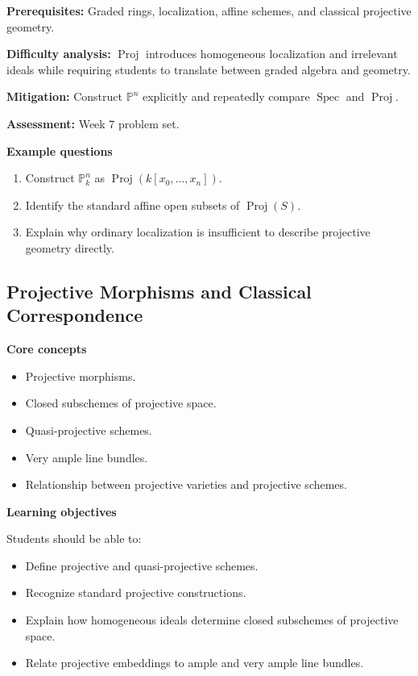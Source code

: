 \documentclass[11pt]{article}
\begin{document}
\textbf{Prerequisites:} Graded rings, localization, affine schemes, and classical projective geometry.

\textbf{Difficulty analysis:} $\operatorname{Proj}$ introduces homogeneous localization and irrelevant ideals while requiring students to translate between graded algebra and geometry.

\textbf{Mitigation:} Construct $\mathbb{P}^n$ explicitly and repeatedly compare $\operatorname{Spec}$ and $\operatorname{Proj}$.

\textbf{Assessment:} Week 7 problem set.

\textbf{Example questions}
\begin{enumerate}
    \item Construct $\mathbb{P}^n_k$ as $\operatorname{Proj}(k[x_0,\ldots,x_n])$.
    \item Identify the standard affine open subsets of $\operatorname{Proj}(S)$.
    \item Explain why ordinary localization is insufficient to describe projective geometry directly.
\end{enumerate}

\subsection{Projective Morphisms and Classical Correspondence}

\textbf{Core concepts}
\begin{itemize}
    \item Projective morphisms.
    \item Closed subschemes of projective space.
    \item Quasi-projective schemes.
    \item Very ample line bundles.
    \item Relationship between projective varieties and projective schemes.
\end{itemize}

\textbf{Learning objectives}

Students should be able to:
\begin{itemize}
    \item Define projective and quasi-projective schemes.
    \item Recognize standard projective constructions.
    \item Explain how homogeneous ideals determine closed subschemes of projective space.
    \item Relate projective embeddings to ample and very ample line bundles.
\end{itemize}
\end{document}
